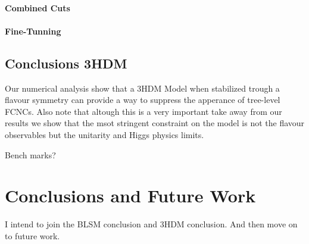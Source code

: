 \subsubsection{Combined Cuts}

\subsubsection{Fine-Tunning}

\section{Conclusions 3HDM} 

Our numerical analysis show that a 3HDM Model when stabilized trough a flavour symmetry can provide a way to suppress the apperance of tree-level FCNCs. Also note that altough this is a very important take away from our results we show that the msot stringent constraint on the model is not the flavour observables but the unitarity and Higgs physics limits. 

Bench marks? 

\chapter{Conclusions and Future Work}

I intend to join the BLSM conclusion and 3HDM conclusion. And then move on to future work. 
